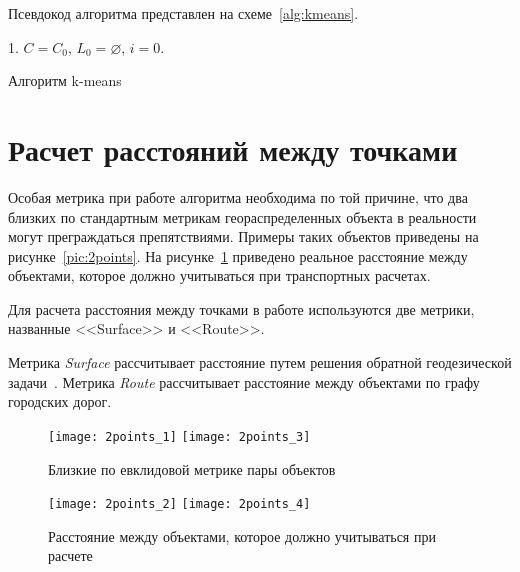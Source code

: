 Псевдокод алгоритма представлен на схеме~\ref{alg:kmeans}.
\begin{algorithm}
    1. \( C = C_0 \), \( L_0 = \varnothing \), \( i = 0\). 
    \caption{Алгоритм k-means}
    \label{alg:kmeans}
\end{algorithm}

\section{Расчет расстояний между точками} \label{sec:distance}

Особая метрика при работе алгоритма необходима по той причине, что два близких по стандартным метрикам геораспределенных объекта в реальности могут преграждаться препятствиями. Примеры таких объектов приведены на рисунке~\ref{pic:2points}. На рисунке~\ref{pic:2points-1} приведено реальное расстояние между объектами, которое должно учитываться при транспортных расчетах.

Для расчета расстояния между точками в работе используются две метрики, названные <<Surface>> и <<Route>>.

Метрика \emph{Surface} рассчитывает расстояние путем решения обратной геодезической задачи~\cite[с. 48-50]{geodesic}. Метрика \emph{Route} рассчитывает расстояние между объектами по графу городских дорог.

\begin{figure}[t!]
    \centering
    \texttt{[image: 2points\_1]} \hspace{1ex}
    \texttt{[image: 2points\_3]} \\[.5ex]
    \parbox{.9\textwidth}{\caption{Близкие по евклидовой метрике пары объектов}\label{pic:2points}}
    \texttt{[image: 2points\_2]} \hspace{1ex}
    \texttt{[image: 2points\_4]} \\[.5ex]
    \parbox{.9\textwidth}{\caption{Расстояние между объектами, которое должно учитываться при расчете}\label{pic:2points-1}}
\end{figure}

